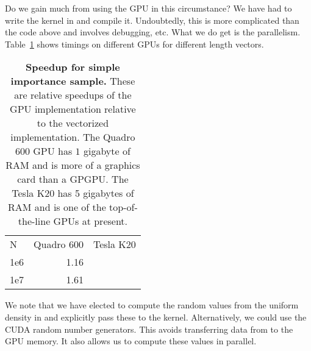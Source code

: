 Do we gain much from using the GPU in this circumstance?
We have had to write the kernel in \C{} and compile it.
Undoubtedly, this is more complicated than the \R{} code above
and involves debugging, etc.
What we do get is the parallelism. 
Table~\ref{tab:ImportanceSamplingTimings} shows timings
on different GPUs for different length vectors.
\begin{table}
\begin{tabular}{lrr}
 N  & Quadro 600 & Tesla K20 \\
1e6 &  1.16  &  \\
1e7 &  1.61  &  \\
\end{tabular}
\caption{\textbf{Speedup for simple importance sample.}
These are relative speedups of the GPU implementation relative
to the vectorized \R{} implementation.
The Quadro 600 GPU has $1$ gigabyte of RAM and is more of a
graphics card than a GPGPU.
The Tesla K20 has 5 gigabytes of RAM and is one of the top-of-the-line
GPUs at present.
}\label{tab:ImportanceSamplingTimings} 
\end{table}
\begin{comment}
ids = lapply(list.files(pattern = "rda$"), load, globalenv())
times = structure(lapply(unlist(ids), function(id) get(id)[3,]), names = unlist(ids))
tm = cbind(data.frame(times = sapply(times, median)), as.data.frame(do.call(rbind, strsplit(unlist(ids), "\\."))))
names(tm) = c('times', 'fun', 'N', 'GPU')
with(tm, tapply(tm, list(N, GPU), function(x) x[1, 'times']/x[2, 'times']))
\end{comment}



We note that we have elected to compute the random values from the
uniform density in \R{} and explicitly pass these to the kernel.
Alternatively, we could use the CUDA random number generators.
This avoids transferring data from \R{} to the GPU memory.
It also allows us to compute these values in parallel.

